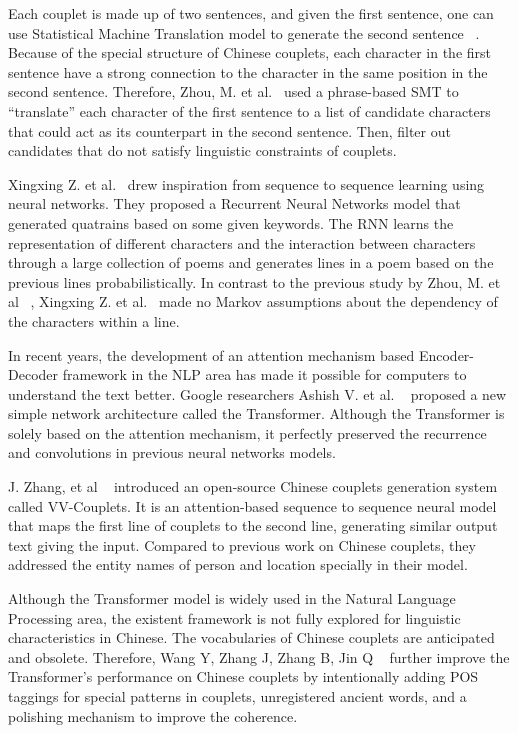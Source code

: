 \documentclass[11pt]{article}
\begin{document}
Each couplet is made up of two sentences, and given the first sentence, one can use Statistical Machine Translation model to generate the second sentence ~\cite{Zhou:09}. Because of the special structure of Chinese couplets, each character in the first sentence have a strong connection to the character in the same position in the second sentence. Therefore, Zhou, M. et al.~ used a phrase-based SMT to “translate” each character of the first sentence to a list of candidate characters that could act as its counterpart in the second sentence. Then, filter out candidates that do not satisfy linguistic constraints of couplets. 

Xingxing Z. et al.~ drew inspiration from sequence to sequence learning using neural networks. They proposed a Recurrent Neural Networks model that generated quatrains based on some given keywords. The RNN learns the representation of different characters and the interaction between characters through a large collection of poems and generates lines in a poem based on the previous lines probabilistically. In contrast to the previous study by Zhou, M. et al ~, Xingxing Z. et al.~ made no Markov assumptions about the dependency of the characters within a line. 

In recent years, the development of an attention mechanism based Encoder-Decoder framework in the NLP area has made it possible for computers to understand the text better. Google researchers Ashish V. et al. ~ proposed a new simple network architecture called the Transformer. Although the Transformer is solely based on the attention mechanism, it perfectly preserved the recurrence and convolutions in previous neural networks models. 

J. Zhang, et al ~ introduced an open-source Chinese couplets generation system called VV-Couplets. It is an attention-based sequence to sequence neural model that maps the first line of couplets to the second line, generating similar output text giving the input. Compared to previous work on Chinese couplets, they addressed the entity names of person and location specially in their model.

Although the Transformer model is widely used in the Natural Language Processing area, the existent framework is not fully explored for linguistic characteristics in Chinese. The vocabularies of Chinese couplets are anticipated and obsolete. Therefore, Wang Y, Zhang J, Zhang B, Jin Q ~ further improve the Transformer’s performance on Chinese couplets by intentionally adding POS taggings for special patterns in couplets, unregistered ancient words, and a polishing mechanism to improve the coherence.
\end{document}
